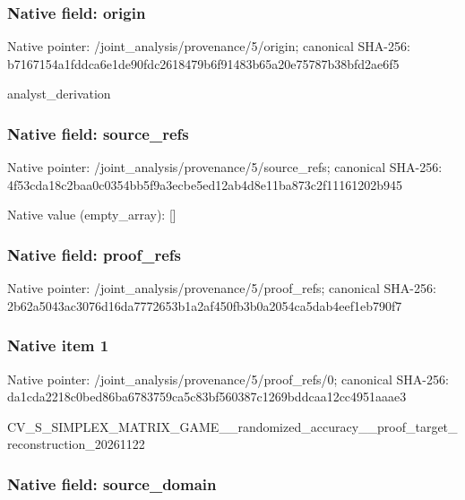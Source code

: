 \documentclass[10pt,a4paper]{article}
\begin{document}
\subsubsection{Native field: origin}


Native pointer: /joint\_analysis/provenance/5/origin; canonical SHA-256: b7167154a1fddca6e1de90fd\allowbreak{}c2618479b6f91483b65a20e7\allowbreak{}5787b38bfd2ae6f5


analyst\_derivation


\subsubsection{Native field: source\_refs}


Native pointer: /joint\_analysis/provenan\allowbreak{}ce/5/source\_refs; canonical SHA-256: 4f53cda18c2baa0c0354bb5f\allowbreak{}9a3ecbe5ed12ab4d8e11ba87\allowbreak{}3c2f11161202b945



Native value (empty\_array): []



\subsubsection{Native field: proof\_refs}


Native pointer: /joint\_analysis/provenance/5/proof\_refs; canonical SHA-256: 2b62a5043ac3076d16da7772\allowbreak{}653b1a2af450fb3b0a2054ca\allowbreak{}5dab4eef1eb790f7



\subsubsection{Native item 1}


Native pointer: /joint\_analysis/provenan\allowbreak{}ce/5/proof\_refs/0; canonical SHA-256: da1cda2218c0bed86ba67837\allowbreak{}59ca5c83bf560387c1269bdd\allowbreak{}caa12cc4951aaae3


CV\_S\_SIMPLEX\_MATRIX\_GAME\allowbreak{}\_\_randomized\_accuracy\_\_p\allowbreak{}roof\_target\_reconstructi\allowbreak{}on\_20261122


\subsubsection{Native field: source\_domain}
\end{document}
